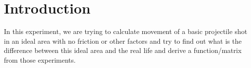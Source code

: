 \chapter{Introduction}
In this experiment, we are trying to calculate movement of a basic projectile shot in an ideal area with no friction or other factors and try to find out what is the difference between this ideal area and the real life and derive a function/matrix from those experiments.
